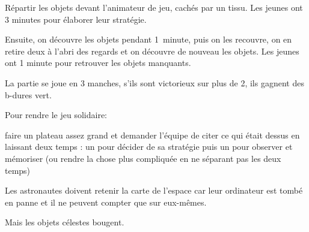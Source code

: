 \documentclass{grand-jeu}
\begin{document}
\begin{liste-materiel}
\end{liste-materiel}

\begin{regles}
Répartir les objets devant l’animateur de jeu, cachés par un tissu. Les jeunes ont 3 minutes pour élaborer leur stratégie.

Ensuite, on découvre les objets pendant 1 minute, puis on les recouvre, on en retire deux à l’abri des regards et on découvre de nouveau les objets. Les jeunes ont 1 minute pour retrouver les objets manquants.

La partie se joue en 3 manches, s’ils sont victorieux sur plus de 2, ils gagnent des b-dures vert.

\vspace{0.2cm}

Pour rendre le jeu solidaire:

faire un plateau assez grand et demander l’équipe de citer ce qui était dessus en laissant deux temps : un pour décider de sa stratégie puis un pour observer et mémoriser (ou rendre la chose plus compliquée en ne séparant pas les deux temps) 
\end{regles}

\begin{imaginaire}
Les astronautes doivent retenir la carte de l’espace car leur ordinateur est tombé en panne et il ne peuvent compter que sur eux-mêmes.

Mais les objets célestes bougent.
\end{imaginaire}

\begin{moments-stop}
\end{moments-stop}
\end{document}
